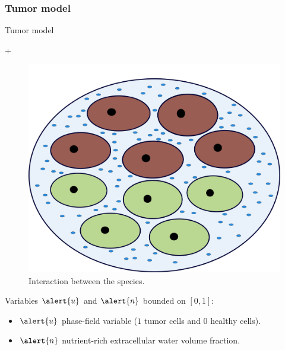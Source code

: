 \subsubsection{Tumor model}
\begin{frame}{Tumor model}
	\begin{block}{}
		\begin{center}
			 \alert{+} 
		\end{center}
	\end{block}
	\begin{figure}[h!]
		\centering
		\includegraphics[scale=0.1]{img/celulas.png}
		\caption{Interaction between the species.}
	\end{figure}
	Variables $\alert{u}$ and $\alert{n}$ bounded on $[0,1]$:
	\begin{itemize}
		\item $\alert{u}$ phase-field variable ($1$ tumor cells and $0$ healthy cells).
		\item $\alert{n}$ nutrient-rich extracellular water volume fraction.
	\end{itemize}

	
\end{frame}

